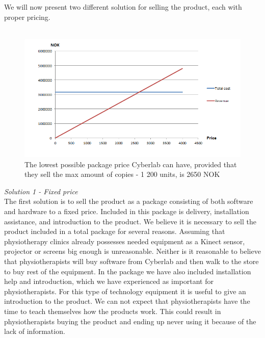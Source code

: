 We will now present two different solution for selling the product, each with proper pricing.\\ \\
\begin{figure}
\label{fig:RevenueStreamPrice}
\begin{center}
\includegraphics[scale=0.8]{revenuestreamprice}
\caption[Price example]{The lowest possible package price Cyberlab can have, provided that they sell the max amount of  copies - 1 200 units, is 2650 NOK}
\end{center}
\end{figure}
\emph{Solution 1 - Fixed price}\\ 
The first solution is to sell the product as a package consisting of both software and hardware to a fixed price. Included in this package is delivery, installation assistance, and introduction to the product. We believe it is necessary  to sell the product included in a total package for several reasons. Assuming that physiotherapy clinics already possesses needed equipment as a Kinect sensor, projector or screens big enough is unreasonable. Neither is it reasonable to believe that physiotherapists will buy software from Cyberlab and then walk to the store to buy rest of the equipment. In the package we have also included installation help and introduction, which we have experienced as important for physiotherapists. For this type of technology equipment it is useful to give an introduction to the product. We can not expect that physiotherapists have the time to teach themselves how the products work. This could result in physiotherapists buying the product and ending up never using it because of the lack of information. \\ \\
